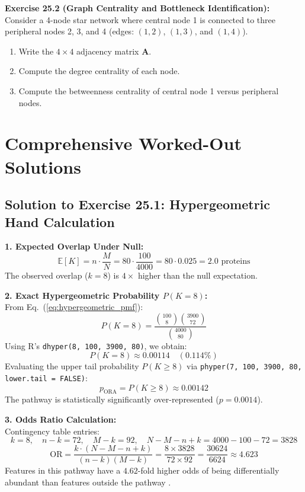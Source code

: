 \documentclass[11pt,oneside]{book}
\begin{document}
\vspace{0.8em}
\noindent
\textbf{Exercise 25.2 (Graph Centrality and Bottleneck Identification):}\\
Consider a 4-node star network where central node 1 is connected to three peripheral nodes 2, 3, and 4 (edges: $(1, 2)$, $(1, 3)$, and $(1, 4)$).
\begin{enumerate}
    \item Write the $4 \times 4$ adjacency matrix $\mathbf{A}$.
    \item Compute the degree centrality of each node.
    \item Compute the betweenness centrality of central node 1 versus peripheral nodes.
\end{enumerate}

\section{Comprehensive Worked-Out Solutions}

\subsection*{Solution to Exercise 25.1: Hypergeometric Hand Calculation}

\textbf{1. Expected Overlap Under Null:}\\
$$\mathbb{E}[K] = n \cdot \frac{M}{N} = 80 \cdot \frac{100}{4000} = 80 \cdot 0.025 = 2.0 \text{ proteins}$$
The observed overlap ($k = 8$) is $4\times$ higher than the null expectation.

\textbf{2. Exact Hypergeometric Probability $P(K = 8)$:}\\
From Eq.~(\ref{eq:hypergeometric_pmf}):
$$P(K = 8) = \frac{\binom{100}{8} \binom{3900}{72}}{\binom{4000}{80}}$$
Using R's \texttt{dhyper(8, 100, 3900, 80)}, we obtain:
$$P(K = 8) \approx 0.00114 \quad (0.114\%)$$
Evaluating the upper tail probability $P(K \ge 8)$ via \texttt{phyper(7, 100, 3900, 80, lower.tail = FALSE)}:
$$p_{\text{ORA}} = P(K \ge 8) \approx 0.00142$$
The pathway is statistically significantly over-represented ($p = 0.0014$).

\textbf{3. Odds Ratio Calculation:}\\
Contingency table entries:
$$k = 8, \quad n - k = 72, \quad M - k = 92, \quad N - M - n + k = 4000 - 100 - 72 = 3828$$
$$\text{OR} = \frac{k \cdot (N - M - n + k)}{(n - k)(M - k)} = \frac{8 \times 3828}{72 \times 92} = \frac{30624}{6624} \approx 4.623$$
Features in this pathway have a $4.62$-fold higher odds of being differentially abundant than features outside the pathway \cite{subramanian2005gene, khatri2012ten}.
\end{document}
